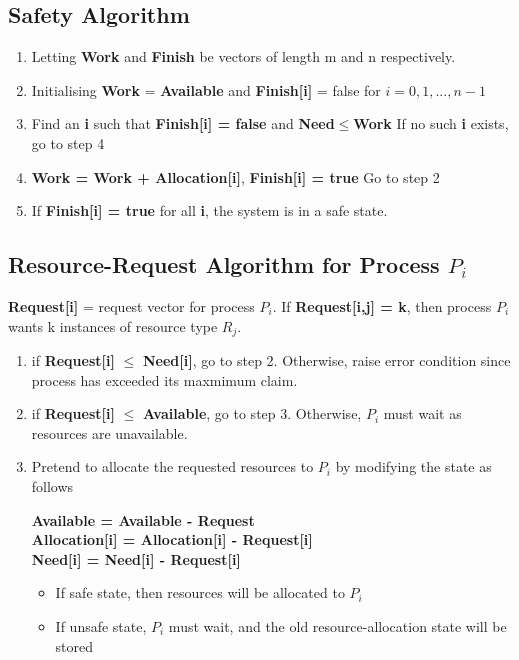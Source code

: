 \documentclass{book/custombook}
\begin{document}
            \subsection{Safety Algorithm}
                \begin{enumerate}
                    \item Letting \textbf{Work} and \textbf{Finish} be vectors of length m and n respectively.
                    \item Initialising \textbf{Work} = \textbf{Available} and \textbf{Finish[i]} = false for $i = 0,1,...,n-1$
                    \item Find an \textbf{i} such that \textbf{Finish[i] = false} and \textbf{Need$\leq$Work}
                        \subitem If no such \textbf{i} exists, go to step 4
                    \item \textbf{Work = Work + Allocation[i]}, \textbf{Finish[i] = true}
                        \subitem Go to step 2
                    \item If \textbf{Finish[i] = true} for all \textbf{i}, the system is in a safe state.
                \end{enumerate}
            \subsection{Resource-Request Algorithm for Process $P_i$}
                \textbf{Request[i]} = request vector for process $P_i$. If \textbf{Request[i,j] = k}, then process
                $P_i$ wants k instances of resource type $R_j$.\\
                \begin{enumerate}
                    \item if \textbf{Request[i]} $\leq$ \textbf{Need[i]}, go to step 2. Otherwise, raise error condition
                    since process has exceeded its maxmimum claim.
                    \item if \textbf{Request[i]} $\leq$ \textbf{Available}, go to step 3. Otherwise, $P_i$ must wait as
                    resources are unavailable.
                    \item Pretend to allocate the requested resources to $P_i$ by modifying the state as follows
                        \begin{center}
                            \textbf{Available = Available - Request}\\
                            \textbf{Allocation[i] = Allocation[i] - Request[i]}\\
                            \textbf{Need[i] = Need[i] - Request[i]}\\
                        \end{center}
                        \begin{itemize}
                            \item If safe state, then resources will be allocated to $P_i$
                            \item If unsafe state, $P_i$ must wait, and the old resource-allocation state will be stored
                        \end{itemize}
                \end{enumerate}
\end{document}
